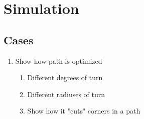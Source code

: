 \chapter{Simulation}

\section{Cases}

\begin{enumerate}
	\item Show how path is optimized
	\begin{enumerate}
		\item Different degrees of turn
		\item Different radiuses of turn
		\item Show how it "cuts" corners in a path
	\end{enumerate}
\end{enumerate}
